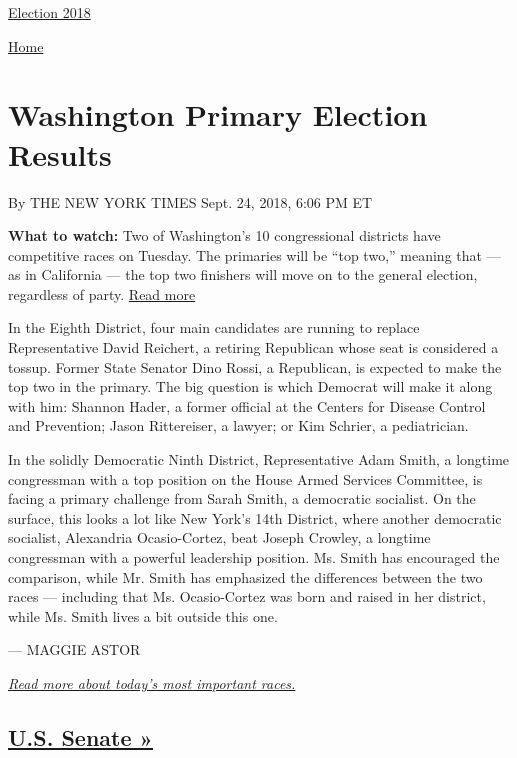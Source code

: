 \href{//www.nytimes3xbfgragh.onion}{}\href{https://www.nytimes3xbfgragh.onion/interactive/2018/us/elections/calendar-primary-results.html}{
Election 2018}

\href{//www.nytimes3xbfgragh.onion}{ Home}

\hypertarget{washington-primary-election-results}{%
\section{Washington Primary Election
Results}\label{washington-primary-election-results}}

By THE NEW YORK TIMES Sept. 24, 2018, 6:06 PM ET

\textbf{What to watch:} Two of Washington's 10 congressional districts
have competitive races on Tuesday. The primaries will be ``top two,''
meaning that --- as in California --- the top two finishers will move on
to the general election, regardless of party. \protect\hyperlink{}{Read
more}

In the Eighth District, four main candidates are running to replace
Representative David Reichert, a retiring Republican whose seat is
considered a tossup. Former State Senator Dino Rossi, a Republican, is
expected to make the top two in the primary. The big question is which
Democrat will make it along with him: Shannon Hader, a former official
at the Centers for Disease Control and Prevention; Jason Rittereiser, a
lawyer; or Kim Schrier, a pediatrician.

In the solidly Democratic Ninth District, Representative Adam Smith, a
longtime congressman with a top position on the House Armed Services
Committee, is facing a primary challenge from Sarah Smith, a democratic
socialist. On the surface, this looks a lot like New York's 14th
District, where another democratic socialist, Alexandria Ocasio-Cortez,
beat Joseph Crowley, a longtime congressman with a powerful leadership
position. Ms. Smith has encouraged the comparison, while Mr. Smith has
emphasized the differences between the two races --- including that Ms.
Ocasio-Cortez was born and raised in her district, while Ms. Smith lives
a bit outside this one.

--- MAGGIE ASTOR

\href{https://www.nytimes3xbfgragh.onion/2018/08/07/us/politics/primary-election-today.html}{\emph{Read
more about today's most important races.}}

\hypertarget{us-senate-}{%
\subsection{\texorpdfstring{\href{https://www.nytimes3xbfgragh.onion/elections/results/washington-senate-open-primary-election}{U.S.
Senate »}}{U.S. Senate »}}\label{us-senate-}}

